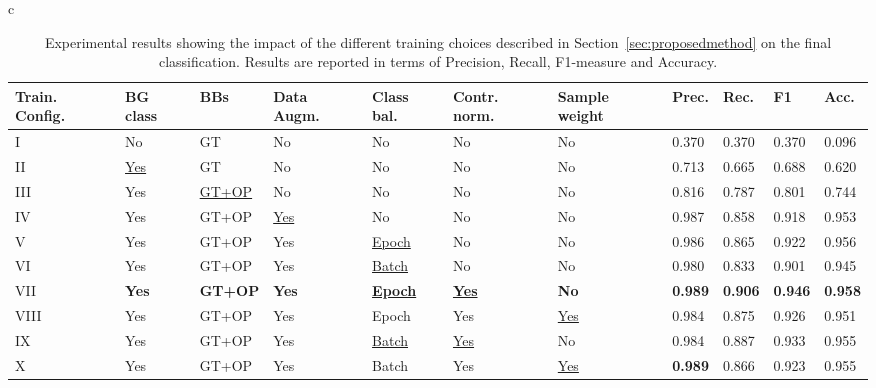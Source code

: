 \documentclass[final,5p,twocolumn]{elsarticle}
\begin{document}
\begin{table*}[!hhtbp]
	\caption{Experimental results showing the impact of the different training choices described in Section~\ref{sec:proposedmethod} on the final classification. Results are reported in terms of Precision, Recall, F1-measure and Accuracy.}
	\label{tab:results_thval}


\begin{tabular}{c}


\begin{tabularx}{1\textwidth}{@{}XXXXXXX|XXXX@{}}
\toprule
\textbf{Train. Config.} & \textbf{BG class} & \textbf{BBs}    & \textbf{Data Augm.}    & \textbf{Class bal.} & \textbf{Contr. norm.}  & \textbf{Sample weight} & \textbf{Prec.} & \textbf{Rec.} & \textbf{F1} & \textbf{Acc.} \\ \midrule
I & No              & GT                & No       & No         & No        & No     & 0.370 & 0.370 & 0.370 & 0.096 \\
II & \underline{Yes} & GT                & No       & No         & No        & No     & 0.713 & 0.665 & 0.688 & 0.620 \\
III & Yes             & \underline{GT+OP} & No       & No         & No        & No     & 0.816 & 0.787 & 0.801 & 0.744 \\
IV & Yes             & GT+OP             & \underline{Yes}      & No         & No        & No     & 0.987 & 0.858 & 0.918 & 0.953 \\
V & Yes             & GT+OP             & Yes      & \underline{Epoch}    & No        & No     & 0.986 & 0.865 & 0.922 & 0.956 \\
VI & Yes             & GT+OP             & Yes      & \underline{Batch}    & No        & No     & 0.980 & 0.833 & 0.901 & 0.945 \\
VII & \textbf{Yes}             & \textbf{GT+OP}             & \textbf{Yes}      & \textbf{\underline{Epoch}}    & \textbf{\underline{Yes}}       & \textbf{No}     & \textbf{0.989} & \textbf{0.906} & \textbf{0.946} & \textbf{0.958} \\
VIII & Yes             & GT+OP             & Yes      & Epoch    & Yes       & \underline{Yes}    & 0.984 & 0.875 & 0.926 & 0.951 \\
IX & Yes             & GT+OP             & Yes      & \underline{Batch}    & \underline{Yes}       & No     & 0.984 & 0.887 & 0.933 & 0.955 \\
X & Yes             & GT+OP             & Yes      & Batch    & Yes       & \underline{Yes}    & \textbf{0.989} & 0.866 & 0.923 & 0.955 \\ \bottomrule
\end{tabularx}



\end{tabular}
\end{table*}
\end{document}
